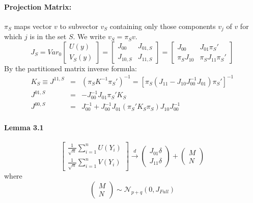 \documentclass[12pt]{article}
\theoremstyle{definition}
\begin{document}
\paragraph{Projection Matrix:} $\pi_S$ maps vector $v$ to subvector $v_S$ containing only those components $v_j$ of $v$ for which $j$ is in the set $S$. We write $v_S = \pi_S v$.
	$$
	J_S = Var_0\left[\begin{array}{c}
		U(y)\\
		V_S(y)
\end{array}\right]=\left[\begin{array}{cc}
		J_{00} & J_{01,S}\\
		J_{10,S} & J_{11,S}
	\end{array}\right]=\left[\begin{array}{cc}
		J_{00} & J_{01}\pi_S'\\
		\pi_S J_{10} & \pi_S J_{11} \pi_S'
	\end{array}\right]
$$
By the partitioned matrix inverse formula:
\begin{eqnarray*}
	K_S \equiv J^{11,S} &=& \left(\pi_S K^{-1} \pi_S'\right)^{-1} = \left[\pi_S \left(J_{11} - J_{10}J_{00}^{-1}J_{01} \right) \pi_S'\right]^{-1} \\
	J^{01,S} &=& -J_{00}^{-1}J_{01}\pi_S'K_S\\
	J^{00,S} &=& J_{00}^{-1} + J_{00}^{-1}J_{01}\left(\pi_S'K_S\pi_S \right)J_{10}J_{00}^{-1}
\end{eqnarray*}

\paragraph{Lemma 3.1}
	$$
	\left[\begin{array}{c}
		\frac{1}{\sqrt{n}}\sum_{i=1}^n U(Y_i)\\
		\frac{1}{\sqrt{n}}\sum_{i=1}^n V(Y_i)
	\end{array}\right] \overset{d}{\rightarrow}
	\left(\begin{array}{c}
		J_{01}\delta\\
		J_{11}\delta
	\end{array}\right) + 	
	\left(\begin{array}{c}
		M\\
		N
	\end{array}\right)
$$
where
	$$
	\left(\begin{array}{c}
		M\\
		N
	\end{array}\right) \sim \mathcal{N}_{p+q}(0, J_{Full})
$$
\end{document}
